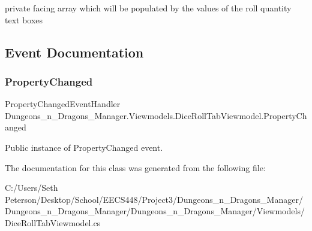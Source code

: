 private facing array which will be populated by the values of the roll quantity text boxes 



\subsection{Event Documentation}
\mbox{\label{class_dungeons__n___dragons___manager_1_1_viewmodels_1_1_dice_roll_tab_viewmodel_a60a0e298fe415c8468751f7eae890129}} 
\subsubsection{\texorpdfstring{Property\+Changed}{PropertyChanged}}
{\footnotesize\ttfamily Property\+Changed\+Event\+Handler Dungeons\+\_\+n\+\_\+\+Dragons\+\_\+\+Manager.\+Viewmodels.\+Dice\+Roll\+Tab\+Viewmodel.\+Property\+Changed}



Public instance of Property\+Changed event. 



The documentation for this class was generated from the following file\+:\begin{DoxyCompactItemize}
\item 
C\+:/\+Users/\+Seth Peterson/\+Desktop/\+School/\+E\+E\+C\+S448/\+Project3/\+Dungeons\+\_\+n\+\_\+\+Dragons\+\_\+\+Manager/\+Dungeons\+\_\+n\+\_\+\+Dragons\+\_\+\+Manager/\+Dungeons\+\_\+n\+\_\+\+Dragons\+\_\+\+Manager/\+Viewmodels/Dice\+Roll\+Tab\+Viewmodel.\+cs\end{DoxyCompactItemize}

